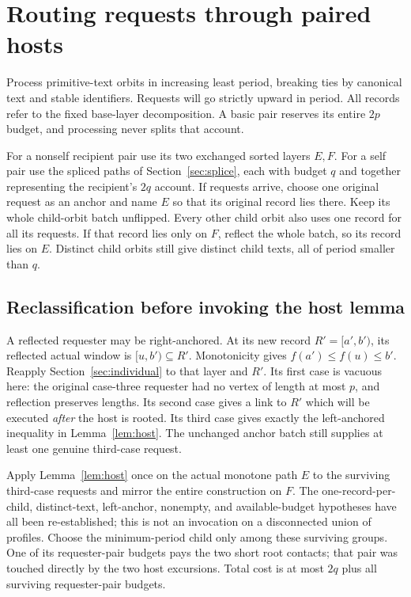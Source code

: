 \section{Routing requests through paired hosts}\label{sec:hosts}
Process primitive-text orbits in increasing least period, breaking ties
by canonical text and stable identifiers. Requests will go strictly
upward in period. All records refer to the fixed base-layer decomposition.
A basic pair reserves its entire $2p$ budget, and processing never splits
that account.

For a nonself recipient pair use its two exchanged sorted layers $E,F$.
For a self pair use the spliced paths of Section~\ref{sec:splice}, each with
budget $q$ and together representing the recipient's $2q$ account.
If requests arrive, choose one original request as an anchor and name
$E$ so that its original record lies there. Keep its whole child-orbit
batch unflipped. Every other child orbit also uses one record for all
its requests. If that record lies only on $F$, reflect the whole batch,
so its record lies on $E$. Distinct child orbits still give distinct
child texts, all of period smaller than $q$.

\subsection{Reclassification before invoking the host lemma}\label{sec:reclassification}
A reflected requester may be right-anchored. At its new record
$R'=[a',b')$, its reflected actual window is $[u,b')\subseteq R'$.
Monotonicity gives $f(a')\le f(u)\le b'$. Reapply
Section~\ref{sec:individual} to that layer and $R'$. Its first case is vacuous
here: the original case-three requester had no vertex of length at
most $p$, and reflection preserves lengths. Its second case gives a
link to $R'$ which will be executed \emph{after} the host is rooted.
Its third case gives exactly the left-anchored inequality in
Lemma~\ref{lem:host}. The unchanged anchor batch still supplies at least one
genuine third-case request.

Apply Lemma~\ref{lem:host} once on the actual monotone path $E$ to the
surviving third-case requests and mirror the entire construction on $F$.
The one-record-per-child, distinct-text, left-anchor, nonempty, and
available-budget hypotheses have all been re-established; this is not
an invocation on a disconnected union of profiles. Choose the
minimum-period child only among these surviving groups. One of its
requester-pair budgets pays the two short root contacts; that pair was
touched directly by the two host excursions. Total cost is at most
$2q$ plus all surviving requester-pair budgets.

